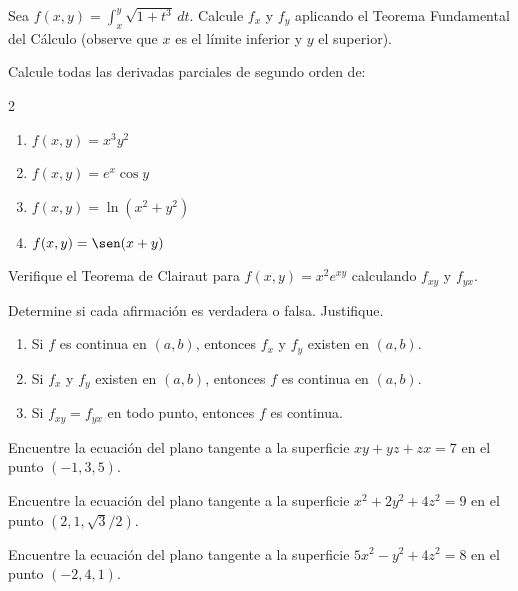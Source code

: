 \begin{prob}
Sea $f(x,y)=\displaystyle\int_x^y \sqrt{1+t^3}\,dt$. Calcule $f_x$ y $f_y$
aplicando el Teorema Fundamental del Cálculo (observe que $x$ es el límite
inferior y $y$ el superior).
\end{prob}

\begin{prob}
Calcule todas las derivadas parciales de segundo orden de:
\begin{multicols}{2}
\begin{enumerate}
    \item $f(x,y)=x^3 y^2$
    \item $f(x,y)=e^x\cos y$
    \item $f(x,y)=\ln(x^2+y^2)$
    \item $f(x,y)=\sen(x+y)$
\end{enumerate}
\end{multicols}
\end{prob}

\begin{prob}
Verifique el Teorema de Clairaut para $f(x,y)=x^2 e^{xy}$ calculando
$f_{xy}$ y $f_{yx}$.
\end{prob}


\begin{prob}
Determine si cada afirmación es verdadera o falsa. Justifique.
\begin{enumerate}
    \item Si $f$ es continua en $(a,b)$, entonces $f_x$ y $f_y$ existen
    en $(a,b)$.
    \item Si $f_x$ y $f_y$ existen en $(a,b)$, entonces $f$ es continua
    en $(a,b)$.
    \item Si $f_{xy}=f_{yx}$ en todo punto, entonces $f$ es continua.
\end{enumerate}
\end{prob}

\begin{prob}
Encuentre la ecuación del plano tangente a la superficie $xy+yz+zx=7$ en el punto $(-1,3,5).$
\end{prob}


\begin{prob}
Encuentre la ecuación del plano tangente a la superficie $x^2+2y^2+4z^2=9$ en el punto $(2,1,\sqrt{3}/2).$
\end{prob}

\begin{prob}
Encuentre la ecuación del plano tangente a la superficie $5x^2-y^2+4z^2=8$ en el punto $(-2,4,1).$
\end{prob}

